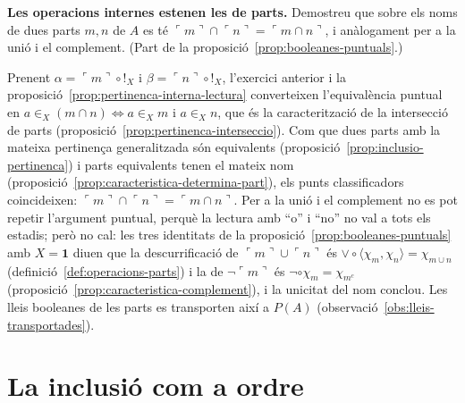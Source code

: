\begin{exercici}
\textbf{Les operacions internes estenen les de parts.} Demostreu que sobre els noms de dues parts \(m,n\) de \(A\) es té \(\ulcorner m\urcorner\cap\ulcorner n\urcorner=\ulcorner m\cap n\urcorner\), i anàlogament per a la unió i el complement. (Part de la proposició~\ref{prop:booleanes-puntuals}.)
\end{exercici}
\begin{solucio}
Prenent \(\alpha=\ulcorner m\urcorner\circ{!}_X\) i \(\beta=\ulcorner n\urcorner\circ{!}_X\), l'exercici anterior i la proposició~\ref{prop:pertinenca-interna-lectura} converteixen l'equivalència puntual en \(a\in_X(m\cap n)\iff a\in_X m\text{ i }a\in_X n\), que és la caracterització de la intersecció de parts (proposició~\ref{prop:pertinenca-interseccio}). Com que dues parts amb la mateixa pertinença generalitzada són equivalents (proposició~\ref{prop:inclusio-pertinenca}) i parts equivalents tenen el mateix nom (proposició~\ref{prop:caracteristica-determina-part}), els punts classificadors coincideixen: \(\ulcorner m\urcorner\cap\ulcorner n\urcorner=\ulcorner m\cap n\urcorner\). Per a la unió i el complement no es pot repetir l'argument puntual, perquè la lectura amb \enquote{o} i \enquote{no} no val a tots els estadis; però no cal: les tres identitats de la proposició~\ref{prop:booleanes-puntuals} amb \(X=\mathbf1\) diuen que la descurrificació de \(\ulcorner m\urcorner\cup\ulcorner n\urcorner\) és \(\vee\circ\langle\chi_m,\chi_n\rangle=\chi_{m\cup n}\) (definició~\ref{def:operacions-parts}) i la de \(\neg\ulcorner m\urcorner\) és \(\neg\circ\chi_m=\chi_{m^c}\) (proposició~\ref{prop:caracteristica-complement}), i la unicitat del nom conclou. Les lleis booleanes de les parts es transporten així a \(P(A)\) (observació~\ref{obs:lleis-transportades}).
\end{solucio}

\section{La inclusió com a ordre}\label{prac:inclusio-ordre}

